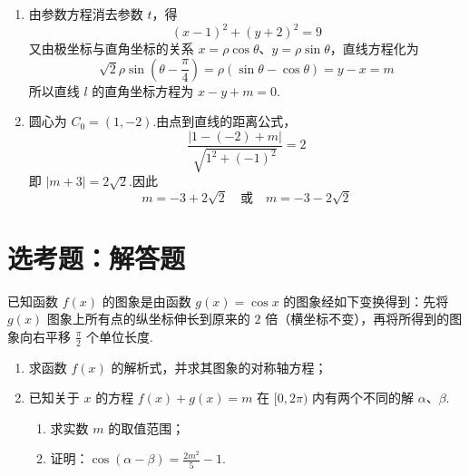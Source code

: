\begin{solution}
\begin{enumerate}
\item 由参数方程消去参数 \(t\)，得
\[
(x-1)^2+(y+2)^2=9
\]
又由极坐标与直角坐标的关系 \(x=\rho\cos\theta\)、\(y=\rho\sin\theta\)，直线方程化为
\[
\sqrt2\rho\sin\left(\theta-\frac\pi4\right)
=\rho(\sin\theta-\cos\theta)=y-x=m
\]
所以直线 \(l\) 的直角坐标方程为 \(x-y+m=0\).

\item 圆心为 \(C_0=(1,-2)\).由点到直线的距离公式，
\[
\frac{|1-(-2)+m|}{\sqrt{1^2+(-1)^2}}=2
\]
即 \(|m+3|=2\sqrt2\).因此
\[
m=-3+2\sqrt2\quad\text{或}\quad m=-3-2\sqrt2
\]
\end{enumerate}
\end{solution}

\section{选考题：解答题}

\begin{problem}
已知函数 \(f(x)\) 的图象是由函数 \(g(x) = \cos x\) 的图象经如下变换得到：先将 \(g(x)\) 图象上所有点的纵坐标伸长到原来的 \(2\) 倍（横坐标不变），再将所得到的图象向右平移 \(\frac{\pi}{2}\) 个单位长度.
\begin{enumerate}
\item 求函数 \(f(x)\) 的解析式，并求其图象的对称轴方程；
\item 已知关于 \(x\) 的方程 \(f(x)+g(x)=m\) 在 \([0,2\pi)\) 内有两个不同的解 \(\alpha\)、\(\beta\).
\begin{enumerate}
\item 求实数 \(m\) 的取值范围；
\item 证明：\(\cos(\alpha-\beta)=\frac{2m^{2}}{5}-1\).
\end{enumerate}
\end{enumerate}
\end{problem}

